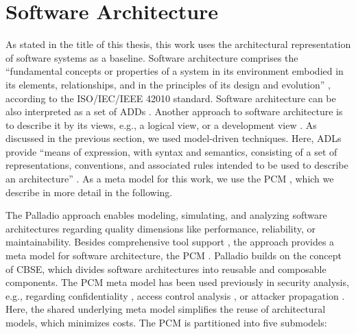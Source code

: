 \section{Software Architecture}%
\label{sec:foundations:architecture}

As stated in the title of this thesis, this work uses the architectural representation of software systems as a baseline.
Software architecture comprises the \enquote{fundamental concepts or properties of a system in its environment embodied in its elements, relationships, and in the principles of its design and evolution} \cite{international_organization_for_standardization_isoiecieee_2022}, according to the ISO/IEC/IEEE 42010 standard.
Software architecture can be also interpreted as a set of \acfp{ADD} \cite{jansen_architectural_2008,jansen_software_2005}.
Another approach to software architecture is to describe it by its views, e.g., a logical view, or a development view \cite{kruchten_41_1995}.
As discussed in the previous section, we used model-driven techniques.
Here, \acfp{ADL} provide \enquote{means of expression, with syntax and semantics, consisting of a set of representations, conventions, and associated rules intended to be used to describe an architecture} \cite{international_organization_for_standardization_isoiecieee_2022}.
As a meta model for this work, we use the \acf{PCM} \cite{reussner_modeling_2016}, which we describe in more detail in the following.

The Palladio approach \cite{reussner_modeling_2016} enables modeling, simulating, and analyzing software architectures regarding quality dimensions like performance, reliability, or maintainability.
Besides comprehensive tool support \cite{reussner_palladio_2024}, the approach provides a meta model for software architecture, the \ac{PCM} \cite{reussner_palladio_2011,reussner_modeling_2016}.
Palladio builds on the concept of \acf{CBSE}, which divides software architectures into reusable and composable components.
The \ac{PCM} meta model has been used previously in security analysis, e.g., regarding confidentiality \cite{seifermann_architectural_2022}, access control analysis \cite{pilipchuk_architectural_2021}, or attacker propagation \cite{walter_context-based_2023}.
Here, the shared underlying meta model simplifies the reuse of architectural models, which minimizes costs.
The \ac{PCM} is partitioned into five submodels:

